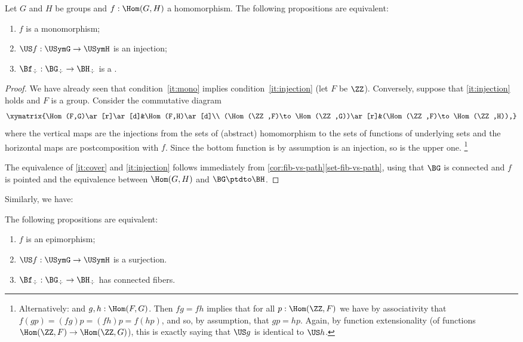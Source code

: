 \begin{lemma}\label{lem:eq-mono-cover}
Let $G$ and $H$ be groups and $f: \Hom(G,H)$ a homomorphism.
The following propositions are equivalent:\label{lem:eq-epi-conn}
\begin{enumerate}
\item\label{it:mono} $f$ is a monomorphism;
\item\label{it:injection} $\US f:\USymG\to\USymH$ is an injection;
\item\label{it:cover} $\Bf_\div:\BG_\div\to \BH_\div$ is a \covering.
\end{enumerate}
\end{lemma}

\begin{proof}
  We have already seen that condition~\ref{it:mono} implies condition~\ref{it:injection} (let $F$ be $\ZZ$).
    Conversely, suppose that \ref{it:injection} holds and $F$ is a group.  Consider the commutative diagram
$$\xymatrix{\Hom(F,G)\ar[r]\ar[d]&\Hom(F,H)\ar[d]\\
  (\Hom(\ZZ,F)\to\Hom(\ZZ,G))\ar[r]&(\Hom(\ZZ,F)\to\Hom(\ZZ,H)),}$$
where the vertical maps are the injections from the sets of (abstract) homomorphism to the sets of functions of underlying sets and the horizontal maps are postcomposition with $f$.  Since the bottom function is by assumption is an injection, so is the upper one.
\footnote{ Alternatively:  and $g,h:\Hom(F,G)$.  Then $fg=fh$ implies that for all $p:\Hom(\ZZ,F)$ we have by associativity that $f(gp)=(fg)p=(fh)p=f(hp)$, and so, by assumption, that $gp=hp$.
  Again, by function extensionality (of functions $\Hom(\ZZ,F)\to\Hom(\ZZ,G)$), this is exactly saying that $\US g$ is identical to $\US h$.}

  The equivalence of \ref{it:cover} and \ref{it:injection} follows
immediately from \cref{cor:fib-vs-path}\ref{set-fib-vs-path}, using
that $\BG$ is connected and $f$ is pointed and the equivalence between $\Hom(G,H)$ and $\BG\ptdto \BH$.
\end{proof}

Similarly, we have:
\begin{lemma}\label{lem:epi-surj}
  The following propositions are equivalent:
\begin{enumerate}[label=(\arabic*')]
\item\label{it:epi} $f$ is an epimorphism;
\item\label{it:surjection} $\US f:\USymG\to\USymH$ is a surjection.
\item\label{it:connfib} $\Bf_\div:\BG_\div\to \BH_\div$ has connected fibers.
\end{enumerate}
\end{lemma}


